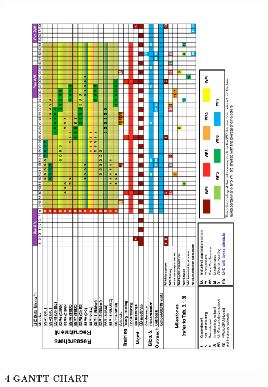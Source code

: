 \clearpage
\captionsetup[figure]{justification=justified,singlelinecheck=false}
\begin{figure}[p]
\vspace{-5mm}
\begin{flushleft}
\caption*{\textbf{\large 4 GANTT CHART\vspace{-5mm}}
\label{sec:gantt}}
\end{flushleft}
\begin{center}
\includegraphics[width=0.835\paperwidth]{figs/gantt_v2.pdf}
\end{center}
\end{figure}
\clearpage\newpage
